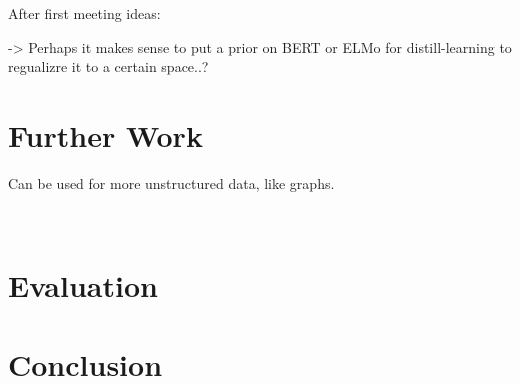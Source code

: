 \documentclass[a4paper,12pt,twoside,openright]{report}
\begin{document}
After first meeting ideas:

-> Perhaps it makes sense to put a prior on BERT or ELMo for distill-learning to regualizre it to a certain space..?

\chapter{Further Work}

Can be used for more unstructured data, like graphs.

\
\chapter{Evaluation}

\chapter{Conclusion}

\appendix
\singlespacing

 
% 
\end{document}
